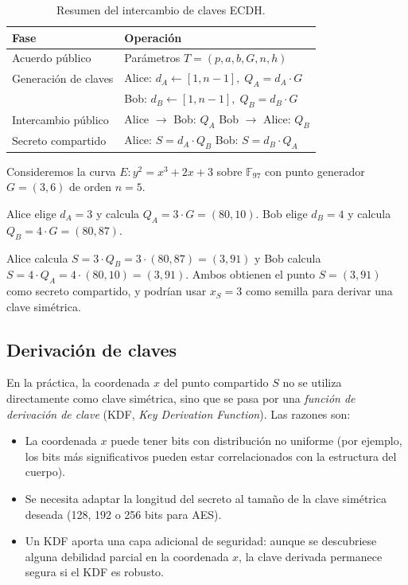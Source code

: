 \begin{table}[htbp]
\centering
\begin{tabular}{ll}
\hline
\textbf{Fase} & \textbf{Operación} \\
\hline
Acuerdo público & Parámetros $T = (p, a, b, G, n, h)$ \\
Generación de claves & Alice: $d_A \gets [1, n-1],\; Q_A = d_A \cdot G$ \\
                      & Bob: \quad $d_B \gets [1, n-1],\; Q_B = d_B \cdot G$ \\
Intercambio público & Alice $\to$ Bob: $Q_A$ \quad Bob $\to$ Alice: $Q_B$ \\
Secreto compartido & Alice: $S = d_A \cdot Q_B$ \quad Bob: $S = d_B \cdot Q_A$ \\
\hline
\end{tabular}
\caption{Resumen del intercambio de claves ECDH.}
\label{tab:ecdh-summary}
\end{table}


\begin{ejemplo}
\label{ej:ecdh-numerico}
Consideremos la curva $E: y^2 = x^3 + 2x + 3$ sobre $\mathbb{F}_{97}$ con punto generador $G = (3, 6)$ de orden $n = 5$.

Alice elige $d_A = 3$ y calcula $Q_A = 3 \cdot G = (80, 10)$. Bob elige $d_B = 4$ y calcula $Q_B = 4 \cdot G = (80, 87)$.

Alice calcula $S = 3 \cdot Q_B = 3 \cdot (80, 87) = (3, 91)$ y Bob calcula $S = 4 \cdot Q_A = 4 \cdot (80, 10) = (3, 91)$. Ambos obtienen el punto $S = (3, 91)$ como secreto compartido, y podrían usar $x_S = 3$ como semilla para derivar una clave simétrica.
\end{ejemplo}


\subsection{Derivación de claves}
\label{subsec:ecdh-kdf}

En la práctica, la coordenada $x$ del punto compartido $S$ no se utiliza directamente como clave simétrica, sino que se pasa por una \emph{función de derivación de clave} (KDF, \textit{Key Derivation Function}). Las razones son:

\begin{itemize}
    \item La coordenada $x$ puede tener bits con distribución no uniforme (por ejemplo, los bits más significativos pueden estar correlacionados con la estructura del cuerpo).
    \item Se necesita adaptar la longitud del secreto al tamaño de la clave simétrica deseada (128, 192 o 256 bits para AES).
    \item Un KDF aporta una capa adicional de seguridad: aunque se descubriese alguna debilidad parcial en la coordenada $x$, la clave derivada permanece segura si el KDF es robusto.
\end{itemize}

